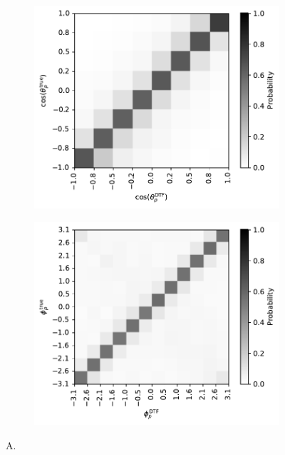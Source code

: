 \begin{figure}[t]
	\centering
	\begin{subfigure}{.45\textwidth}
		\includegraphics[width=\textwidth]{graphics/05-angular_distributions/MCRECO_p_theta_migration.pdf}
		\caption{}
		\label{fig:5:MCRECO_p_theta_migration}
	\end{subfigure}
	\begin{subfigure}{.45\textwidth}
		\includegraphics[width=\textwidth]{graphics/05-angular_distributions/MCRECO_p_phi_migration.pdf}
		\caption{}
		\label{fig:5:MCRECO_p_phi_migration}
	\end{subfigure}
	\caption{A.}
	\label{fig:5:angular_migration_matrices}
\end{figure}

